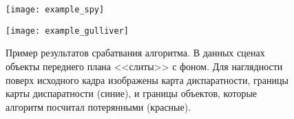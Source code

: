 \begin{figure}[!h]
	\begin{minipage}[b]{1.0\linewidth}
		\centering
		\centerline{ \texttt{[image: example\_spy]} }
	\end{minipage}
	\begin{minipage}[b]{1.0\linewidth}
		\centering
		\centerline{ \texttt{[image: example\_gulliver]} }
	\end{minipage}
    \caption{Пример результатов срабатвания алгоритма. В данных сценах
    	объекты переднего плана <<слиты>> с фоном. Для наглядности
    	поверх исходного кадра изображены карта диспаратности, границы
    	карты диспаратности (синие), и границы объектов, которые алгоритм посчитал
    	потерянными (красные).}
	\label{fig:res_example}
\end{figure}
